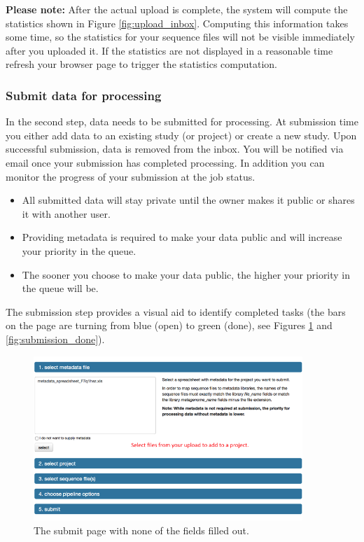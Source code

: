 \documentclass[12pt,fullpage]{report}
\begin{document}
\textbf{Please note:} After the actual upload is complete, the system will compute the statistics shown in Figure \ref{fig:upload_inbox}. Computing this information takes some time, so the statistics for your sequence files will not be visible immediately after you uploaded it. If the statistics are not displayed in a reasonable time refresh your browser page to trigger the statistics computation.


\subsubsection*{Submit data for processing}
In the second step, data needs to be submitted for processing. At submission time you either add data to an existing study (or project) or create a new study. Upon successful submission, data is removed from the inbox. You will be notified via email once your submission has completed processing. In addition you can monitor the progress of your submission at the job status.


\begin{itemize}

\item All submitted data will stay private until the owner makes it public or shares it with another user.


\item Providing metadata is required to make your data public and will increase your priority in the queue.

\item The sooner you choose to make your data public, the higher your priority in the queue will be.
\end{itemize}

The submission step provides a visual aid to identify completed tasks (the bars on the page are turning from blue (open) to green (done), see Figures \ref{fig:submission_open} and \ref{fig:submission_done}).

\begin{figure}
\begin{center}
\includegraphics[width=4in]{Images/submission_open.png}
\end{center} \label{fig:submission_open}
\caption{The submit page with none of the fields filled out.}
\end{figure}
\end{document}
